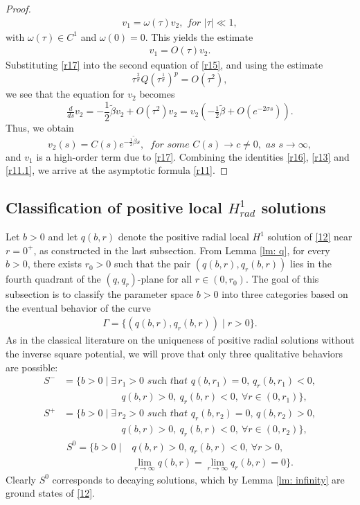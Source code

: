 \documentclass[12pt]{amsart}
\begin{document}
\begin{proof}
\begin{align*}
v_1=\omega(\tau)v_2, \textit{ for } |\tau|\ll 1, 
\end{align*}
with $\omega(\tau)\in C^1$ and $\omega(0)=0$. This yields the estimate
\begin{align}\label{r17}
v_1=O(\tau) v_2. 
\end{align}
Substituting \eqref{r17} into the second equation of \eqref{r15}, and using the estimate
\[
\tau^{\frac 2\sigma}Q(\tau^{\frac 1\sigma})^p =O(\tau^2),
\]
we see that the equation for $v_2$ becomes
\[
\tfrac d{ds}v_2=-\frac 12 \tilde \beta v_2+O(\tau^2)v_2=v_2(-\tfrac 12 \tilde \beta+O(e^{-2\sigma s})). 
\]
Thus, we obtain
\[
v_2(s)=C(s)e^{-\tfrac 12 \tilde \beta s},\ \textit{ for some } C(s)\to c\neq 0, \textit{ as } s\to \infty,
\]
and $v_1$ is a high-order term due to \eqref{r17}. Combining the identities \eqref{r16}, \eqref{r13} and \eqref{r11.1}, we arrive at the asymptotic formula \eqref{r11}. 
\end{proof}

\subsection{Classification of positive  local $H_{rad}^1$ solutions}
Let $b>0$ and let $q(b,r)$ denote the positive radial local $H^1$ solution of \eqref{12} near $r=0^+$, as constructed in the last subsection. From Lemma \ref{lm: q}, for every $b>0$, there exists $r_0>0$ such that the pair $(q(b, r), q_r(b,r))$ lies in the fourth quadrant of the $(q,q_r)$-plane for all $r \in (0, r_0)$. 
The goal of this subsection is to classify the parameter space $b>0$ into three categories based on the eventual behavior of the curve 
\begin{align*}
\Gamma=\{(q(b,r), q_r(b,r)) \mid r >0\}. 
\end{align*}
As in the classical literature on the uniqueness of positive radial solutions without the inverse square potential, we will prove that only three qualitative behaviors are possible:
\begin{align*}
S^-&=\bigl\{b>0\mid \exists \, r_1>0 \textit{ such that } q(b,r_1)=0,\, q_r(b, r_1)<0,    \\
&\qquad\qquad\qquad q(b,r)>0, \ q_r(b,r)<0, \ \forall r\in (0, r_1) \bigr\},
\end{align*}
\begin{align*}
S^+&=\bigl\{b>0 \mid \exists \, r_2> 0 \textit{ such that } q_r(b,r_2)=0,\, q(b, r_2) >0,  \\
&\qquad\qquad\qquad q(b,r)>0, \ q_r(b,r)<0, \ \forall  r\in(0, r_2) \bigr\},
\end{align*}
\begin{align*}
S^0=\bigl\{b>0\mid  &q(b, r)>0,\, q_r(b, r)<0, \, \forall r>0, \\
&\lim_{r\to \infty} q(b,r)=\lim_{r\to \infty} q_r(b,r)=0 \bigr\}.
\end{align*}
Clearly $S^0$ corresponds to decaying solutions, which by Lemma \ref{lm: infinity} are ground states of \eqref{12}. 
\end{document}
